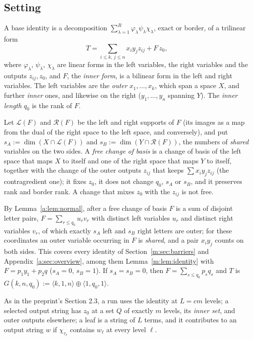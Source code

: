 \documentclass[11pt]{article}
\theoremstyle{definition}
\theoremstyle{remark}
\begin{document}
\subsection{Setting}\label{a:sec:setting}

A base identity is a decomposition $\sum_{\lambda=1}^R\varphi_\lambda\psi_\lambda\chi_\lambda$, exact or border, of a trilinear form
\[
T=\sum_{i\le k,\,j\le n}x_iy_jz_{ij}+F\,z_0,
\]
where $\varphi_\lambda$, $\psi_\lambda$, $\chi_\lambda$ are linear forms in the left variables, the right variables and the outputs $z_{ij},z_0$, and $F$, the \emph{inner form}, is a bilinear form in the left and right variables. The left variables are the \emph{outer} $x_1,\dots,x_k$, which span a space $X$, and further \emph{inner} ones, and likewise on the right ($y_1,\dots,y_n$ spanning $Y$). The \emph{inner length} $q_0$ is the rank of $F$.

Let $\mathcal L(F)$ and $\mathcal R(F)$ be the left and right supports of $F$ (its images as a map from the dual of the right space to the left space, and conversely), and put $s_A:=\dim(X\cap\mathcal L(F))$ and $s_B:=\dim(Y\cap\mathcal R(F))$, the numbers of \emph{shared} variables on the two sides. A \emph{free change of basis} is a change of basis of the left space that maps $X$ to itself and one of the right space that maps $Y$ to itself, together with the change of the outer outputs $z_{ij}$ that keeps $\sum x_iy_jz_{ij}$ (the contragredient one); it fixes $z_0$, it does not change $q_0$, $s_A$ or $s_B$, and it preserves rank and border rank. A change that mixes $z_0$ with the $z_{ij}$ is not free.

By Lemma~\ref{a:lem:normal}, after a free change of basis $F$ is a sum of disjoint letter pairs, $F=\sum_{r\le q_0}u_rv_r$ with distinct left variables $u_r$ and distinct right variables $v_r$, of which exactly $s_A$ left and $s_B$ right letters are outer; for these coordinates an outer variable occurring in $F$ is \emph{shared}, and a pair $x_iy_j$ counts on both sides. This covers every identity of Section~\ref{m:sec:barriers} and Appendix~\ref{a:sec:overview}, among them Lemma~\ref{m:lem:identity} with $F=p_1y_1+p_2q$ ($s_A=0$, $s_B=1$). If $s_A=s_B=0$, then $F=\sum_{s\le q_0}p_sq_s$ and $T$ is $G(k,n,q_0):=\langle k,1,n\rangle\oplus\langle1,q_0,1\rangle$.

As in the preprint's Section 2.3, a run uses the identity at $L=cm$ levels; a selected output string has $z_0$ at a set $Q$ of exactly $m$ levels, its \emph{inner set}, and outer outputs elsewhere; a leaf is a string of $L$ terms, and it contributes to an output string $w$ if $\chi_{\tau_\ell}$ contains $w_\ell$ at every level $\ell$.
\end{document}
